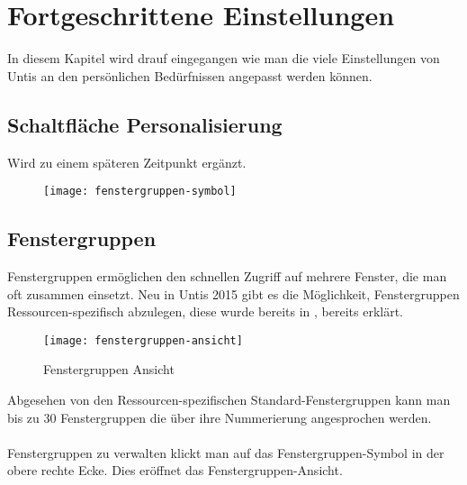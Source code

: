 
\chapter{Fortgeschrittene Einstellungen}
\label{chap:advanced-settings}

In diesem Kapitel wird drauf eingegangen wie man die viele Einstellungen von Untis an den persönlichen Bedürfnissen angepasst werden können.

\section{Schaltfläche Personalisierung}
\label{sec:advanced-quick-access}

Wird zu einem späteren Zeitpunkt ergänzt.

\begin{wrapfigure}{r}{.05\textwidth}
	\vspace{-45pt}
	\texttt{[image: fenstergruppen-symbol]}
	\vspace{-35pt}
\end{wrapfigure}

\section{Fenstergruppen}
\label{sec:fenstergruppen}

Fenstergruppen ermöglichen den schnellen Zugriff auf mehrere Fenster, die man oft zusammen einsetzt. Neu in Untis 2015 gibt es die Möglichkeit, Fenstergruppen Ressourcen-spezifisch abzulegen, diese wurde bereits in , bereits erklärt.\\

\begin{wrapfigure}{r}{.4\textwidth}
	\vspace{-14pt}
	\centering
	\texttt{[image: fenstergruppen-ansicht]}
	\vspace{-5pt}
	\caption{Fenstergruppen Ansicht}
	\label{fig:fenstergruppen-ansicht}
	\vspace{-14pt}
\end{wrapfigure}

\noindent
Abgesehen von den Ressourcen-spezifischen Standard-Fenstergruppen kann man bis zu 30 Fenstergruppen die über ihre Nummerierung angesprochen werden.\\
\\
Fenstergruppen zu verwalten klickt man auf das Fenstergruppen-Symbol in der obere rechte Ecke. Dies eröffnet das Fenstergruppen-Ansicht.

